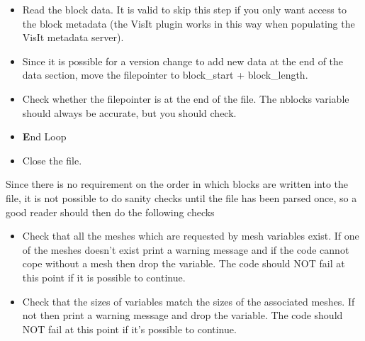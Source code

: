 \documentclass[8pt]{article} \usepackage{url,graphicx,tabularx,array}
\begin{document}
\begin{itemize}
\item Read the block data. It is valid to skip this step if you only want
  access to the block metadata (the VisIt plugin works in this way when
  populating the VisIt metadata server).
\item Since it is possible for a version change to add new data at the end of
  the data section, move the filepointer to block\_start + block\_length.
\item Check whether the filepointer is at the end of the file. The nblocks
  variable should always be accurate, but you should check.
\item {\textbf End Loop}
\item Close the file.
\end{itemize}

Since there is no requirement on the order in which blocks are written into
the file, it is not possible to do sanity checks until the file has been
parsed once, so a good reader should then do the following checks
\begin{itemize}
\item Check that all the meshes which are requested by mesh variables exist. If
  one of the meshes doesn't exist print a warning message and if the code
  cannot cope without a mesh then drop the variable. The code should NOT fail
  at this point if it is possible to continue.
\item Check that the sizes of variables match the sizes of the associated
  meshes. If not then print a warning message and drop the variable. The code
  should NOT fail at this point if it's possible to continue.
\end{itemize}
\end{document}
